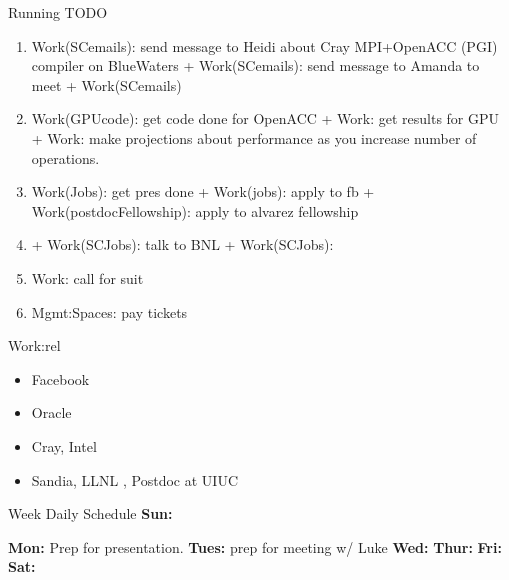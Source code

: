 \begin{frame}
\begin{columns}
\begin{column}{0.50\linewidth}
\begin{block}{Running TODO}
\begin{enumerate}
       \item \tiny Work(SCemails): send message to Heidi about Cray
         MPI+OpenACC (PGI) compiler on BlueWaters +
         Work(SCemails): send message to Amanda to meet +
         Work(SCemails) 

       \item \tiny Work(GPUcode): get code done for OpenACC +
         Work: get results for GPU + Work: make projections about
         performance as you increase number of operations. 

       \item \tiny Work(Jobs): get pres done +  Work(jobs): apply to
         fb + Work(postdocFellowship): apply to alvarez fellowship  

       \item \tiny {} + Work(SCJobs): talk to BNL + Work(SCJobs): 
      
        \tiny \item \tiny Work: call for suit  
 
        \item \tiny Mgmt:Spaces: pay tickets  

        \end{enumerate}        
      \end{block} 
      \begin{block}{Work:rel}
        \begin{itemize} 
        \item \tiny Facebook 
        \item \tiny Oracle
        \item \tiny Cray, Intel  
          \tiny \item \tiny Sandia, LLNL , Postdoc at UIUC  
        \end{itemize}
\end{block}

      \begin{block}{Week Daily Schedule} 
        {\small \textbf{Sun:}  }    {\small \textbf{Mon:} Prep for presentation. \small \textbf{Tues:} prep for meeting w/ Luke \small
          \textbf{Wed:}  \small \textbf{Thur:} \small
          \textbf{Fri:}  \small \textbf{Sat:} \small 

}
\end{block}
\end{column}
\end{columns}
\end{frame}
